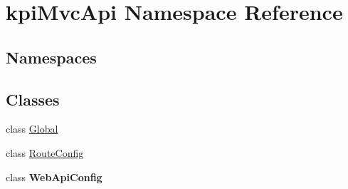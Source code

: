 \hypertarget{namespacekpi_mvc_api}{}\section{kpi\+Mvc\+Api Namespace Reference}
\label{namespacekpi_mvc_api}
\subsection*{Namespaces}
\begin{DoxyCompactItemize}
\end{DoxyCompactItemize}
\subsection*{Classes}
\begin{DoxyCompactItemize}
\item 
class \hyperlink{classkpi_mvc_api_1_1_global}{Global}
\item 
class \hyperlink{classkpi_mvc_api_1_1_route_config}{Route\+Config}
\item 
class {\bfseries Web\+Api\+Config}
\end{DoxyCompactItemize}
